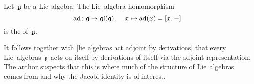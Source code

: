 \begin{definition}
  Let~$\mathfrak{g}$ be a Lie~algebra.
  The  Lie~algebra homomorphism
  \[
    \operatorname{ad}
    \colon
    \mathfrak{g}
    \to
    \mathfrak{gl}(\mathfrak{g}) \,,
    \quad
    x
    \mapsto
    \operatorname{ad}(x)
    =
    [x,-]
  \]
  is the  of~$\mathfrak{g}$.
\end{definition}


\begin{remark}
  It follows together with \cref{lie algebras act adjoint by derivations} that every Lie~algebras~$\mathfrak{g}$ acts on itself by derivations of itself via the adjoint representation.
  The author suspects that this is where much of the structure of Lie~algebras comes from and why the Jacobi identity is of interest.
\end{remark}


